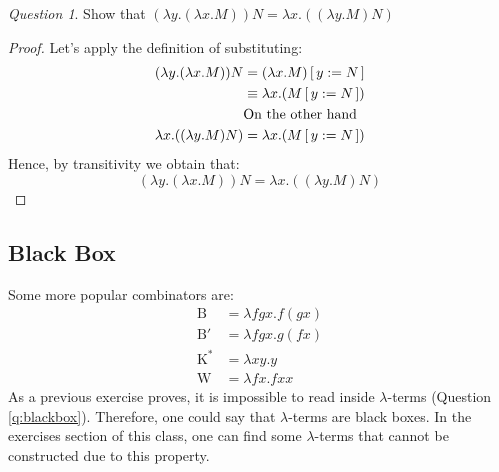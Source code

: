\documentclass[11pt]{article}
\theoremstyle{definition}
\theoremstyle{remark}
\theoremstyle{remark}
\newtheorem{question}{Question}
\theoremstyle{definition}
\newcommand{\K}{\pmb{\mathrm{K}}}
\begin{document}
\begin{question}
  Show that $(\lambda y. (\lambda x. M))N = \lambda x. ((\lambda y.M)N)$
\end{question}
\begin{proof}
  Let's apply the definition of substituting:
  \begin{align*}
    (\lambda y. (\lambda x. M)) N &= (\lambda x. M)\cx[y := N] \\
                                  &\equiv \lambda x. (M\cx[y := N]) \\
                                  &\text{On the other hand} \\
    \lambda x. ((\lambda y. M)N) &= \lambda x. (M\cx[y := N])
  \end{align*}
  Hence, by transitivity we obtain that:
  \begin{equation*}
    (\lambda y. (\lambda x. M)) N = \lambda x. ((\lambda y. M)N)
  \end{equation*}
\end{proof}

\subsection{Black Box}
Some more popular combinators are:
%
\begin{align*}
  \pmb{\mathrm{B}} &= \lambda fgx.f(gx) \\
  \pmb{\mathrm{B}'} &= \lambda fgx.g(fx) \\
  \K^* &= \lambda xy. y \\
  \pmb{\mathrm{W}} &= \lambda fx.fxx
\end{align*}
%
As a previous exercise proves, it is impossible to read inside $\lambda$-terms
(Question \ref{q:blackbox}). Therefore, one could say that $\lambda$-terms are
black boxes. In the exercises section of this class, one can find some
$\lambda$-terms that cannot be constructed due to this property.
\end{document}
